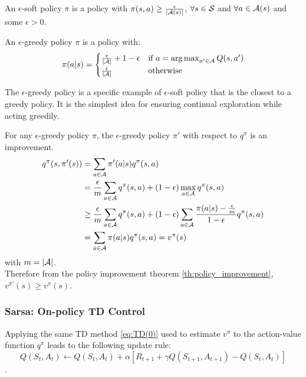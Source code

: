 \begin{definition}
    An $\epsilon$-soft policy $\pi$ is a policy with $\pi(s,a) \ge \frac{\epsilon}{|\mathcal{A}(s)|}$, $\forall s \in \mathcal{S}$ and $\forall a \in \mathcal{A}(s)$ and some $\epsilon > 0$.
\end{definition}

\begin{definition}
    An $\epsilon$-greedy policy $\pi$ is a policy with:
    \begin{equation*}
        \pi(a|s) =
        \begin{cases}
            \frac{\epsilon}{|\mathcal{A}|} + 1 - \epsilon & \text{if } a = \operatorname*{arg\,max}_{a' \in \mathcal{A}}Q(s, a') \\
            \frac{\epsilon}{|\mathcal{A}|}                & \text{otherwise}
        \end{cases}
    \end{equation*}
\end{definition}

The $\epsilon$-greedy policy is a specific example of $\epsilon$-soft policy that is the closest to a greedy policy.
It is the simplest idea for ensuring continual exploration while acting greedily.

\begin{theorem}
    For any $\epsilon$-greedy policy $\pi$, the $\epsilon$-greedy policy $\pi'$ with respect to $q^\pi$ is an improvement.
    \begin{align*}
        q^\pi(s,\pi'(s))    &= \sum_{a \in \mathcal{A}}\pi'(a|s)q^\pi(s,a) \\
                            &= \frac{\epsilon}{m}\sum_{a \in \mathcal{A}}q^\pi(s,a) + (1 - \epsilon)\max_{a \in \mathcal{A}}q^\pi(s,a) \\
                            &\ge \frac{\epsilon}{m}\sum_{a \in \mathcal{A}}q^\pi(s,a) + (1 - \epsilon)\sum_{a \in \mathcal{A}}\frac{\pi(a|s) - \frac{\epsilon}{m}}{1 - \epsilon}q^\pi(s,a) \\
                            &= \sum_{a \in \mathcal{A}}\pi(a|s)q^\pi(s,a) = v^\pi(s)
    \end{align*}
    with $m = |\mathcal{A}|$. \\
    Therefore from the policy improvement theorem \ref{th:policy_improvement}, $v^{\pi'}(s) \ge v^\pi(s)$.
\end{theorem}

\subsubsection{Sarsa: On-policy TD Control}
Applying the same TD method \eqref{eq:TD(0)} used to estimate $v^\pi$ to the action-value function $q^\pi$ leads to the following update rule:
\begin{equation*}
    Q(S_t, A_t) \gets Q(S_t, A_t) + \alpha [R_{t+1} + \gamma Q(S_{t+1}, A_{t+1}) - Q(S_t, A_t)]
\end{equation*}.

